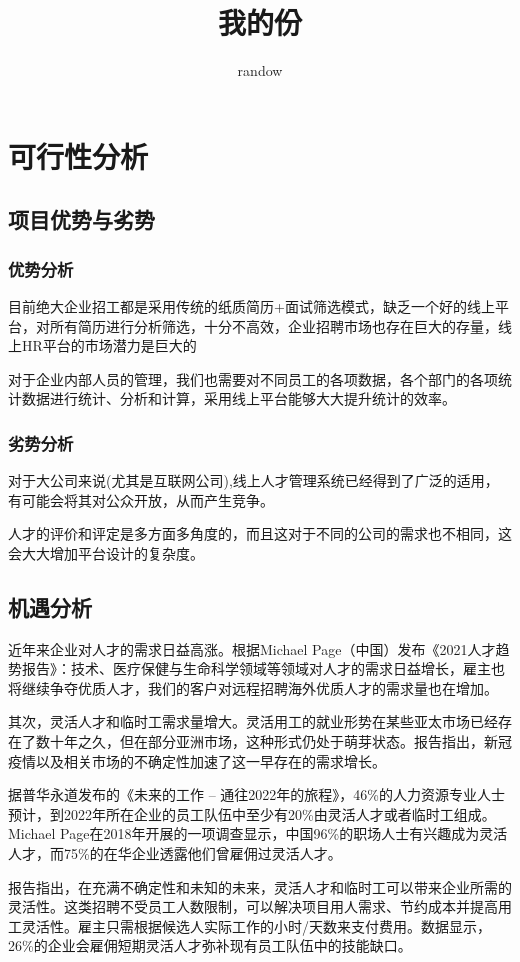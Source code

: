 \documentclass[a4,UTF8]{ctexart}
\title{我的份}
\author{randow}
\begin{document}
\maketitle
\tableofcontents

\section{可行性分析}
\subsection{项目优势与劣势}
\subsubsection{优势分析}
目前绝大企业招工都是采用传统的纸质简历+面试筛选模式，缺乏一个好的线上平台，对所有简历进行分析筛选，十分不高效，企业招聘市场也存在巨大的存量，线上HR平台的市场潜力是巨大的

对于企业内部人员的管理，我们也需要对不同员工的各项数据，各个部门的各项统计数据进行统计、分析和计算，采用线上平台能够大大提升统计的效率。
\subsubsection{劣势分析}
对于大公司来说(尤其是互联网公司),线上人才管理系统已经得到了广泛的适用，有可能会将其对公众开放，从而产生竞争。

人才的评价和评定是多方面多角度的，而且这对于不同的公司的需求也不相同，这会大大增加平台设计的复杂度。
\subsection{机遇分析}
近年来企业对人才的需求日益高涨。根据Michael Page（中国）发布《2021人才趋势报告》：技术、医疗保健与生命科学领域等领域对人才的需求日益增长，雇主也将继续争夺优质人才，我们的客户对远程招聘海外优质人才的需求量也在增加。

其次，灵活人才和临时工需求量增大。灵活用工的就业形势在某些亚太市场已经存在了数十年之久，但在部分亚洲市场，这种形式仍处于萌芽状态。报告指出，新冠疫情以及相关市场的不确定性加速了这一早存在的需求增长。

据普华永道发布的《未来的工作 – 通往2022年的旅程》，46\%的人力资源专业人士预计，到2022年所在企业的员工队伍中至少有20\%由灵活人才或者临时工组成。Michael Page在2018年开展的一项调查显示，中国96\%的职场人士有兴趣成为灵活人才，而75\%的在华企业透露他们曾雇佣过灵活人才。

报告指出，在充满不确定性和未知的未来，灵活人才和临时工可以带来企业所需的灵活性。这类招聘不受员工人数限制，可以解决项目用人需求、节约成本并提高用工灵活性。雇主只需根据候选人实际工作的小时/天数来支付费用。数据显示，26\%的企业会雇佣短期灵活人才弥补现有员工队伍中的技能缺口。
\end{document}
